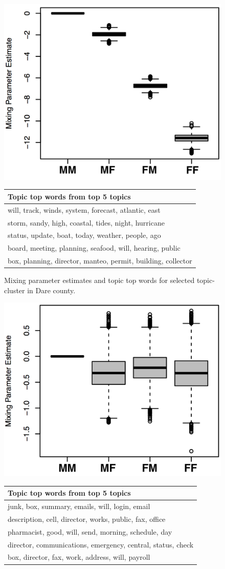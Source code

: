 \documentclass{pnastwo}
\begin{document}
\begin{article}
\begin{figure}
	\centering
	\includegraphics[width = .37\textwidth]{./images/Dare_3_MP.png}
	\begin{tabular}{m{}}
	\toprule
	Topic top words from top 5 topics\\
	\midrule
	will, track, winds, system, forecast, atlantic, east\\ 
	storm, sandy, high, coastal, tides, night, hurricane\\ 
	status, update, boat, today, weather, people, ago\\ 
	board, meeting, planning, seafood, will, hearing, public\\ 
	box, planning, director, manteo, permit, building, collector\\ 
	\bottomrule

	\end{tabular}
	\caption{\label{tab: dare 3 mp} Mixing parameter estimates and topic top words for selected topic-cluster in Dare county.}
\end{figure}


\begin{figure}
	\centering
	\includegraphics[width = .37\textwidth]{./images/Hoke_3_MP.png}
	\begin{tabular}{m{}}
	\toprule
	Topic top words from top 5 topics\\
	\midrule
	junk, box, summary, emails, will, login, email\\ 
	description, cell, director, works, public, fax,  office\\ 
	pharmacist, good, will, send, morning, schedule, day\\ 
	director, communications, emergency, central, status, check\\ 
	box, director, fax, work, address, will, payroll\\ 
	\bottomrule


\end{tabular}
\end{figure}
\end{article}
\end{document}
